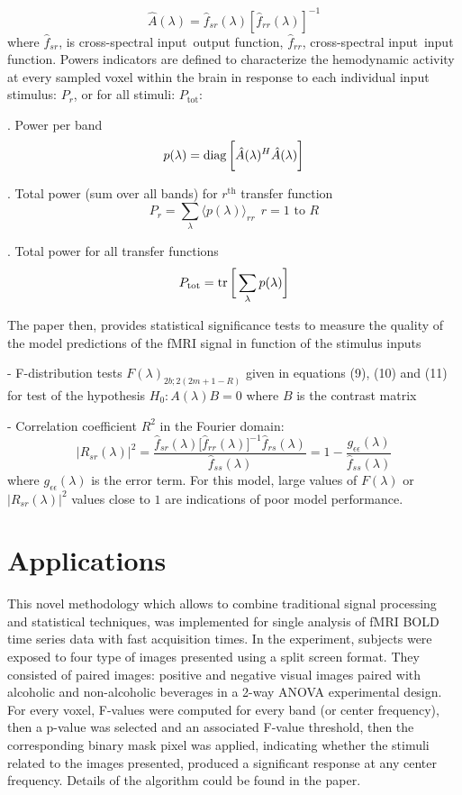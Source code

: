 \documentclass[12pt,twoside]{article}
\begin{document}
\[
	\hat{A}(\lambda) = \hat{f}_{sr} (\lambda) [ \hat{f}_{rr} (\lambda)]^{-1}
\]
where  $\hat{f}_{sr}$, is cross-spectral input~output function, $\hat{f}_{rr}$, cross-spectral input~input function.
Powers indicators are defined to characterize  the hemodynamic activity at every sampled voxel
within the brain in response to each individual input stimulus: $P_r$, or for all stimuli: $P_\text{tot}$:
\be
		\item [.] Power per band
		\[
			p(\lambda) = \operatorname{diag} \bigg [ \hat{A}(\lambda)^H \hat{A}(\lambda) \bigg ]
		\]
		\item [.] Total power (sum over all bands) for $r^{\text{th}}$ transfer function
		\[
			P_r = \sum_\lambda \langle p(\lambda) \rangle_{rr} ~ ~ r=1 \text{ to } R
		\]
		\item [.] Total power for all transfer functions
		\[
			P_{\text{tot}} = \operatorname{tr} \bigg [  \sum_\lambda p(\lambda) \bigg ]
		\]
\ee

The paper then, provides statistical significance tests to measure the quality of the model predictions of the fMRI signal in function of the stimulus inputs

\be
		\item [-] F-distribution tests $F(\lambda)_{2b;2 (2m+1-R)}$ given in equations (9), (10) and (11) for test of the hypothesis $H_0: A(\lambda) B = 0$ where $B$ is the contrast matrix
		
		\item [-]  Correlation coefficient $R^2$ in the Fourier domain:
		\[
			|R_{sr}(\lambda)|^2 = \frac{ \hat{f}_{sr}(\lambda) \bigg [ \hat{f}_{rr} (\lambda) \bigg ]^{-1}   \hat{f}_{rs} (\lambda)  } { \hat{f}_{ss} (\lambda) } = 1 - \frac{g_{\epsilon\epsilon}  (\lambda)} { \hat{f}_{ss} (\lambda)} 
		\]
		where $g_{\epsilon\epsilon}  (\lambda)$ is the error term. For this model, large values of $F(\lambda)$ or $|R_{sr}(\lambda)|^2$ values close to $1$ are indications of poor model performance.
\ee

\section*{Applications}
This novel methodology which allows to combine traditional signal processing and statistical techniques, was implemented for single analysis of fMRI BOLD time series data with fast acquisition times. In the experiment, subjects were exposed to four type of images presented using a split screen format. They consisted of paired images: positive and negative visual images paired with alcoholic and non-alcoholic beverages in a 2-way ANOVA experimental design. For every voxel, F-values were computed for every band (or center frequency), then a p-value was selected and an associated F-value threshold, then the corresponding binary mask pixel was applied, indicating whether the stimuli related to the images presented, produced a significant response at any center frequency. Details of the algorithm could be found in the paper. 
\end{document}
